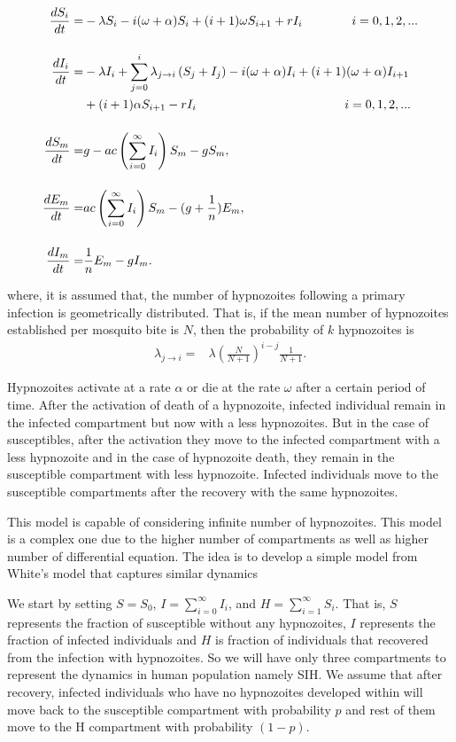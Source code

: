\documentclass[12pt]{article}
\begin{document}
\begin{align}
    \label{eqn:2.1}
    \frac {dS_i}{dt}=&-\lambda S_i-i(\omega+\alpha)S_i+(i+1)\omega S_{i+1}+rI_i\qquad \qquad i=0,1,2,...\\[12pt]
    \label{eqn:2.2}
    \frac {dI_i}{dt}=&-\lambda I_i+\sum_{j=0}^{i} \lambda_{j\rightarrow i}\left(S_j+I_j\right)-i(\omega+\alpha)I_i+(i+1)(\omega+\alpha)I_{i+1}\notag\\&+(i+1)\alpha S_{i+1}-rI_i\qquad\qquad\qquad\qquad\qquad\qquad  i=0,1,2,...\\[12pt]
    \label{eqn:2.3}
    \frac {dS_m}{dt}=&g-ac\left(\sum_{i=0}^\infty I_i\right)S_m-gS_m,\\[12pt]
    \label{eqn:2.4}
    \frac {dE_m}{dt}=&ac\left(\sum_{i=0}^\infty I_i\right)S_m-(g+\frac{1}{n})E_m, \\[12pt]
    \label{eqn:2.5}
    \frac {dI_m}{dt}=&\frac{1}{n}E_m-gI_m.
\end{align}

where, it is assumed that, the number of hypnozoites following a primary infection is geometrically distributed. That is, if the mean number of hypnozoites established per mosquito bite is $N$, then the probability of $k$ hypnozoites is
\begin{align*}
\lambda_{j\rightarrow i}=&\lambda\left(\frac{N}{N+1}\right)^{i-j}\frac{1}{N+1}.
\end{align*}

Hypnozoites activate at a rate $\alpha$ or die at the rate $\omega$ after a certain period of time. After the activation of death of a hypnozoite, infected individual remain in the infected compartment but now with a less hypnozoites. But in the case of susceptibles, after the activation they move to the infected compartment with a less hypnozoite and in the case of hypnozoite death, they remain in the susceptible compartment with less hypnozoite.  Infected individuals move to the susceptible compartments after the recovery with the same hypnozoites. 

This model is capable of considering infinite number of hypnozoites. This model is a complex one due to the higher number of compartments as well as higher number of differential equation. The idea is to develop a simple model from White's model that captures similar dynamics

We start by setting $S=S_0$, $I=\sum_{i=0}^\infty I_i$, and $H=\sum_{i=1}^\infty S_i$. That is, $S$ represents the fraction of susceptible without any hypnozoites, $I$ represents the fraction of infected individuals and $H$ is fraction of individuals that recovered from the infection with hypnozoites. So we will have only three compartments to represent the dynamics in human population namely SIH. We assume that after recovery, infected individuals who have no hypnozoites developed within will move back to the susceptible compartment with probability $p$ and rest of them move to the H compartment with probability $(1-p)$.
\end{document}
